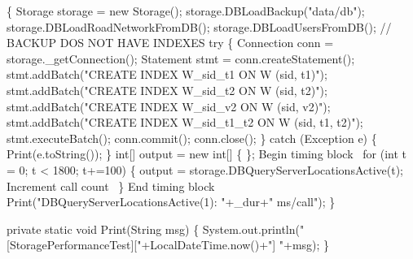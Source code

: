 \documentclass{article}
\def\nwendcode{\endtrivlist \endgroup}
\let\nwdocspar=\par
\begin{document}
\nwenddocs{}\endmoddef{}
\{
  Storage storage = new Storage();
  storage.DBLoadBackup("data/db");
  storage.DBLoadRoadNetworkFromDB();
  storage.DBLoadUsersFromDB();
  // BACKUP DOS NOT HAVE INDEXES
  try \{
    Connection conn = storage._getConnection();
    Statement stmt = conn.createStatement();
    stmt.addBatch("CREATE INDEX W_sid_t1 ON W (sid, t1)");
    stmt.addBatch("CREATE INDEX W_sid_t2 ON W (sid, t2)");
    stmt.addBatch("CREATE INDEX W_sid_v2 ON W (sid, v2)");
    stmt.addBatch("CREATE INDEX W_sid_t1_t2 ON W (sid, t1, t2)");
    stmt.executeBatch();
    conn.commit();
    conn.close();
  \} catch (Exception e) \{
    Print(e.toString());
  \}
  int[] output = new int[] \{ \};
  \LA{}Begin timing block~{\nwtagstyle{}}\RA{}
  for (int t = 0; t < 1800; t+=100) \{
    output = storage.DBQueryServerLocationsActive(t);
    \LA{}Increment call count~{\nwtagstyle{}}\RA{}
  \}
  \LA{}End timing block~{\nwtagstyle{}}\RA{}
  Print("DBQueryServerLocationsActive(1): "+_dur+" ms/call");
\}
\nwendcode{}\nwdocspar

\nwenddocs{}\endmoddef{}
private static void Print(String msg) \{
  System.out.println("[StoragePerformanceTest]["+LocalDateTime.now()+"] "+msg);
\}
\nwendcode{}
\end{document}
